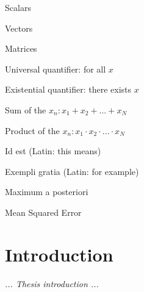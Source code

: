 \documentclass[a4paper,12pt]{article}
\begin{document}
%
%
\maketitle

\makeabstract

\maketableofcontents

\makelistoffigures

\makelistoftables


%
%
\makelistofsymbols
\begin{symbols}
    \item[$a, b, c$] Scalars
    \item[$\boldsymbol{x, y, z}$] Vectors
    \item[$\boldsymbol{A, B, C}$] Matrices
    \item[$\forall x$] Universal quantifier: for all $x$
    \item[$\exists x$] Existential quantifier: there exists $x$
    \item[$\sum_{n=1}^{N} x_n$] Sum of the $x_n : x_1 + x_2 + ... + x_N$ 
    \item[$\prod_{n=1}^{N} x_n$] Product of the $x_n : x_1 \cdot x_2 \cdot ... \cdot x_N$ 
\end{symbols}

\newpage

\makelistofabbrv
\begin{abbrv}
    \item[i.e.] Id est (Latin: this means)
    \item[e.g.] Exempli gratia (Latin: for example)
    \item[MAP] Maximum a posteriori
    \item[MSE] Mean Squared Error
\end{abbrv}
\newpage

\setcounter{page}{1} %


%
%

\section{Introduction}
\textit{... Thesis introduction ...}
\newpage
\end{document}
